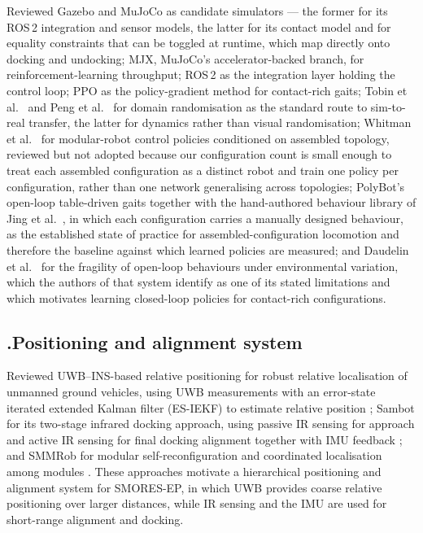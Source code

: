 \documentclass[11pt,a4paper]{article}
\newcounter{gsec}
\newcounter{gsub}
\newcommand{\curgsec}{}
\newcommand{\gsep}{\texorpdfstring{\quad}{ }}
\newcommand{\gtocsub}[2]{%
  \phantomsection
  \addcontentsline{toc}{subsection}{#1\gsep #2}%
}
\newcommand{\gsubsection}[1]{%
  \refstepcounter{gsub}%
  \edef\gsublbl{\curgsec.\thegsub}%
  \expandafter\gtocsub\expandafter{\gsublbl}{#1}%
  \subsection*{\gsublbl\quad #1}%
}
\begin{document}
Reviewed Gazebo \cite{koenig2004} and MuJoCo \cite{todorov2012} as candidate
simulators --- the former for its ROS\,2 integration and sensor models, the
latter for its contact model and for equality constraints that can be toggled
at runtime, which map directly onto docking and undocking; MJX, MuJoCo's
accelerator-backed branch, for reinforcement-learning throughput; ROS\,2
\cite{macenski2022} as the integration layer holding the control loop; PPO
\cite{schulman2017} as the policy-gradient method for contact-rich gaits; Tobin
et al.\ \cite{tobin2017} and Peng et al.\ \cite{peng2018} for domain
randomisation as the standard route to sim-to-real transfer, the latter for
dynamics rather than visual randomisation; Whitman et al.\ \cite{whitman2023}
for modular-robot control policies conditioned on assembled topology, reviewed
but not adopted because our configuration count is small enough to treat each
assembled configuration as a distinct robot and train one policy per
configuration, rather than one network generalising across topologies;
PolyBot's open-loop table-driven gaits \cite{yim2003} together with the
hand-authored behaviour library of Jing et al.\ \cite{jing2016,jing2018}, in
which each configuration carries a manually designed behaviour, as the
established state of practice for assembled-configuration locomotion and
therefore the baseline against which learned policies are measured; and
Daudelin et al.\ \cite{daudelin2018} for the fragility of open-loop behaviours
under environmental variation, which the authors of that system identify as one
of its stated limitations and which motivates learning closed-loop policies for
contact-rich configurations.

\gsubsection{Positioning and alignment system}

Reviewed UWB--INS-based relative positioning for robust relative localisation
of unmanned ground vehicles, using UWB measurements with an error-state
iterated extended Kalman filter (ES-IEKF) to estimate relative position
\cite{zhang2022}; Sambot for its two-stage infrared docking approach, using
passive IR sensing for approach and active IR sensing for final docking
alignment together with IMU feedback \cite{wei2011}; and SMMRob for modular
self-reconfiguration and coordinated localisation among modules
\cite{li2022}. These approaches motivate a hierarchical positioning and
alignment system for SMORES-EP, in which UWB provides coarse relative
positioning over larger distances, while IR sensing and the IMU are used for
short-range alignment and docking.
\end{document}
